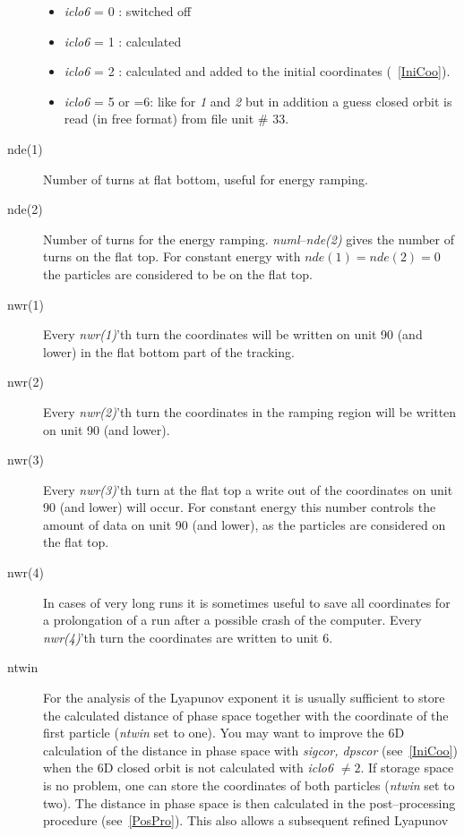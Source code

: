 \documentclass[a4paper,11pt]{report}
\begin{document}
\begin{description}
 \begin{itemize}
 \item {\em iclo6} \/= 0 : switched off
 \item {\em iclo6} \/= 1 : calculated
 \item {\em iclo6} \/= 2 : calculated and added to the initial
   coordinates (~\ref{IniCoo}).
 \item {\em iclo6} \/= 5 or =6: like for {\em 1} \/and {\em 2} \/but
   in addition a guess closed orbit is read (in free format) from file
   unit \# 33.
 \end{itemize}
\item [nde(1)] Number of turns at flat bottom, useful for energy
  ramping.
\item [nde(2)] Number of turns for the energy ramping.  {\em
    numl}\/--{\em nde(2)} \/ gives the number of turns on the flat
  top. For constant energy with \mbox{$ nde(1) = nde(2) = 0 $} the
  particles are considered to be on the flat top.
\item [nwr(1)] Every {\em nwr(1)}\/'th turn the coordinates will be
  written on unit 90 (and lower) in the flat bottom part of the
  tracking.
\item [nwr(2)] Every {\em nwr(2)}\/'th turn the coordinates in the
  ramping region will be written on unit 90 (and lower).
\item [nwr(3)] Every {\em nwr(3)}\/'th turn at the flat top a write
  out of the coordinates on unit 90 (and lower) will occur.  For
  constant energy this number controls the amount of data on unit 90
  (and lower), as the particles are considered on the flat top.
\item [nwr(4)] In cases of very long runs it is sometimes useful to
  save all coordinates for a prolongation of a run after a possible
  crash of the computer.  Every {\em nwr(4)}\/'th turn the coordinates
  are written to unit 6.
\item [ntwin] For the analysis of the Lyapunov exponent it is usually
  sufficient to store the calculated distance of phase space together
  with the coordinate of the first particle ({\em ntwin} \/set to
  one). You may want to improve the 6D calculation of the distance in
  phase space with {\em sigcor, dpscor} \/(see~\ref{IniCoo}) when the
  6D closed orbit is not calculated with {\em iclo6} \/$\neq 2$. If
  storage space is no problem, one can store the coordinates of both
  particles ({\em ntwin} \/set to two). The distance in phase space is
  then calculated in the post--processing procedure
  (see~\ref{PosPro}). This also allows a subsequent refined Lyapunov

\end{description}
\end{document}

